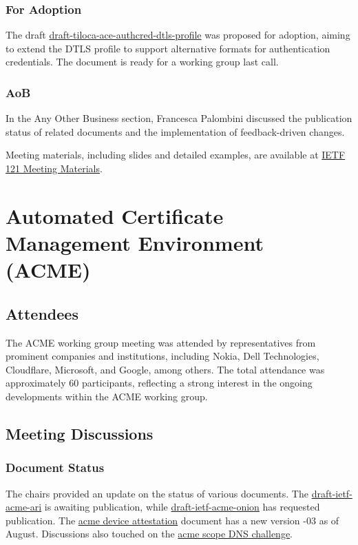 \documentclass{article}
\begin{document}
\subsubsection{For Adoption}
The draft \href{https://datatracker.ietf.org/doc/html/draft-tiloca-ace-authcred-dtls-profile}{draft-tiloca-ace-authcred-dtls-profile} was proposed for adoption, aiming to extend the DTLS profile to support alternative formats for authentication credentials. The document is ready for a working group last call.

\subsubsection{AoB}
In the Any Other Business section, Francesca Palombini discussed the publication status of related documents and the implementation of feedback-driven changes.

Meeting materials, including slides and detailed examples, are available at \href{https://datatracker.ietf.org/meeting/121/materials/}{IETF 121 Meeting Materials}.




\newpage

\section{Automated Certificate Management Environment (ACME)}

\subsection{Attendees}

The ACME working group meeting was attended by representatives from prominent companies and institutions, including Nokia, Dell Technologies, Cloudflare, Microsoft, and Google, among others. The total attendance was approximately 60 participants, reflecting a strong interest in the ongoing developments within the ACME working group.

\subsection{Meeting Discussions}

\subsubsection{Document Status}

The chairs provided an update on the status of various documents. The \href{https://datatracker.ietf.org/doc/html/draft-ietf-acme-ari}{draft-ietf-acme-ari} is awaiting publication, while \href{https://datatracker.ietf.org/doc/html/draft-ietf-acme-onion}{draft-ietf-acme-onion} has requested publication. The \href{https://datatracker.ietf.org/doc/html/draft-ietf-acme-device-attestation}{acme device attestation} document has a new version -03 as of August. Discussions also touched on the \href{https://datatracker.ietf.org/doc/html/draft-ietf-acme-scope-dns-challenge}{acme scope DNS challenge}.
\end{document}
